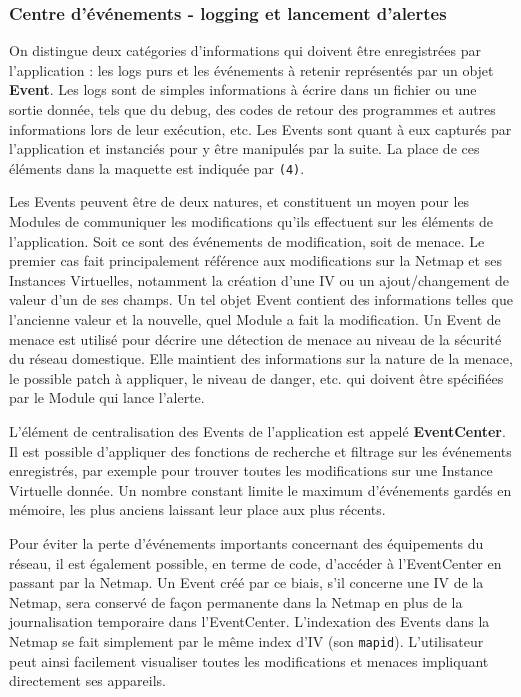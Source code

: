 \documentclass[]{article}
\begin{document}
\newpage

\subsubsection{Centre d’événements - logging et lancement d'alertes}

On distingue deux catégories d'informations qui doivent être enregistrées par l'application : les logs purs et les événements à retenir représentés par un objet \textbf{Event}. Les logs sont de simples informations à écrire dans un fichier ou une sortie donnée, tels que du debug, des codes de retour des programmes et autres informations lors de leur exécution, etc. Les Events sont quant à eux capturés par l'application et instanciés pour y être manipulés par la suite. La place de ces éléments dans la maquette est indiquée par \texttt{(4)}.\\

\par Les Events peuvent être de deux natures, et constituent un moyen pour les Modules de communiquer les modifications qu'ils effectuent sur les éléments de l'application. Soit ce sont des événements de modification, soit de menace. Le premier cas fait principalement référence aux modifications sur la Netmap et ses Instances Virtuelles, notamment la création d'une IV ou un ajout/changement de valeur d'un de ses champs. Un tel objet Event contient des informations telles que l'ancienne valeur et la nouvelle, quel Module a fait la modification. Un Event de menace est utilisé pour décrire une détection de menace au niveau de la sécurité du réseau domestique. Elle maintient des informations sur la nature de la menace, le possible patch à appliquer, le niveau de danger, etc. qui doivent être spécifiées par le Module qui lance l'alerte.\\

\par L'élément de centralisation des Events de l'application est appelé \textbf{EventCenter}. Il est possible d'appliquer des fonctions de recherche et filtrage sur les événements enregistrés, par exemple pour trouver toutes les modifications sur une Instance Virtuelle donnée. Un nombre constant limite le maximum d'événements gardés en mémoire, les plus anciens laissant leur place aux plus récents.\\

\par Pour éviter la perte d'événements importants concernant des équipements du réseau, il est également possible, en terme de code, d'accéder à l'EventCenter en passant par la Netmap. Un Event créé par ce biais, s'il concerne une IV de la Netmap, sera conservé de façon permanente dans la Netmap en plus de la journalisation temporaire dans l'EventCenter. L'indexation des Events dans la Netmap se fait simplement par le même index d'IV (son \texttt{mapid}). L'utilisateur peut ainsi facilement visualiser toutes les modifications et menaces impliquant directement ses appareils.
\end{document}
